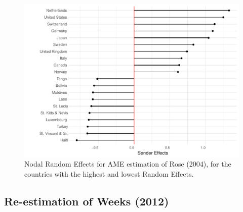 \documentclass{article}[12pt]
\begin{document}
\begin{figure}
\includegraphics[width=\textwidth]{rose_aeff_top10.pdf}
 \caption{Nodal Random Effects for AME estimation of Rose (2004), for the countries with the highest and lowest Random Effects.}\label{fig:roser}
\end{figure}
\FloatBarrier

\subsection{Re-estimation of Weeks (2012)}
\end{document}
